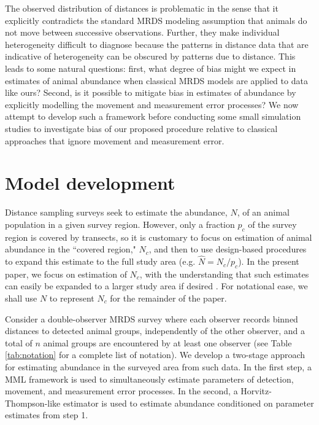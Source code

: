 \documentclass[aoas,preprint]{imsart}
\numberwithin{equation}{section}
\theoremstyle{plain}
\begin{document}
The observed distribution of distances is problematic in the sense that it explicitly contradicts the standard MRDS modeling assumption that animals do not move between successive observations. Further, they make individual heterogeneity difficult to diagnose because the patterns in distance data that are indicative of heterogeneity can be obscured by patterns due to distance. This leads to some natural questions: first, what degree of bias might we expect in estimates of animal abundance when classical MRDS models are applied to data like ours?  Second, is it possible to mitigate bias in estimates of abundance by explicitly modelling the movement and measurement error processes?  We now attempt to develop such a framework before conducting some small simulation studies to investigate bias of our proposed procedure relative to classical approaches that ignore movement and measurement error.

\section{Model development}

Distance sampling surveys seek to estimate the abundance, $N$, of an animal population in a given survey region. However, only a fraction $p_c$ of the survey region is covered by transects, so it is customary to focus on estimation of animal abundance in the ``covered region," $N_c$, and then to use design-based procedures to expand this estimate to the full study area (e.g. $\hat{N}=N_c/p_c$).  In the present paper, we focus on estimation of $N_c$, with the understanding that such estimates can easily be expanded to a larger study area if desired \citep[e.g.][]{BucklandEtAl2004}.  For notational ease, we shall use $N$ to represent $N_c$ for the remainder of the paper.

Consider a double-observer MRDS survey where each observer records binned distances to detected animal groups, independently of the other observer, and a total of $n$ animal groups are encountered by at least one observer (see Table \ref{tab:notation} for a complete list of notation).  We develop a two-stage approach for estimating abundance in the surveyed area from such data.  In the first step, a MML framework is used to simultaneously estimate parameters of detection, movement, and measurement error processes.  In the second, a Horvitz-Thompson-like estimator is used to estimate abundance conditioned on parameter estimates from step 1.
\end{document}
